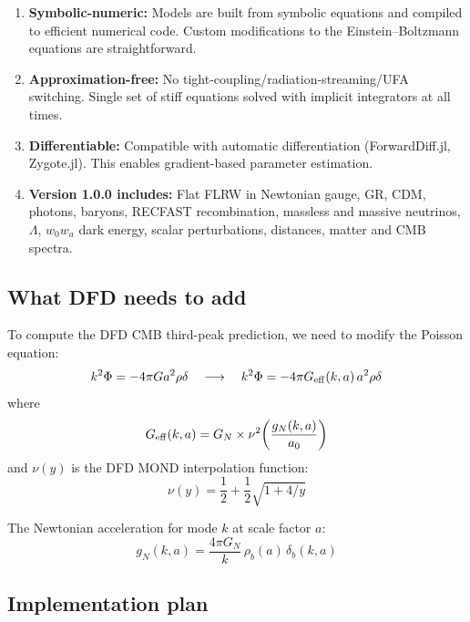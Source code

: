 \documentclass[11pt,a4paper]{article}
\begin{document}
\begin{enumerate}
\item \textbf{Symbolic-numeric:} Models are built from symbolic equations and compiled to efficient numerical code. Custom modifications to the Einstein--Boltzmann equations are straightforward.
\item \textbf{Approximation-free:} No tight-coupling/radiation-streaming/UFA switching. Single set of stiff equations solved with implicit integrators at all times.
\item \textbf{Differentiable:} Compatible with automatic differentiation (ForwardDiff.jl, Zygote.jl). This enables gradient-based parameter estimation.
\item \textbf{Version 1.0.0 includes:} Flat FLRW in Newtonian gauge, GR, CDM, photons, baryons, RECFAST recombination, massless and massive neutrinos, $\Lambda$, $w_0w_a$ dark energy, scalar perturbations, distances, matter and CMB spectra.
\end{enumerate}

\subsection{What DFD needs to add}

To compute the DFD CMB third-peak prediction, we need to modify the Poisson equation:
\begin{equation}
k^2\Phi = -4\pi G a^2 \rho\delta \quad \longrightarrow \quad k^2\Phi = -4\pi G_{\rm eff}(k, a)\,a^2\rho\delta
\end{equation}
where
\begin{equation}
G_{\rm eff}(k, a) = G_N \times \nu^2\!\left(\frac{g_N(k, a)}{a_0}\right)
\end{equation}
and $\nu(y)$ is the DFD MOND interpolation function:
\begin{equation}
\nu(y) = \frac{1}{2} + \frac{1}{2}\sqrt{1 + 4/y}
\end{equation}

The Newtonian acceleration for mode $k$ at scale factor $a$:
\begin{equation}
g_N(k, a) = \frac{4\pi G_N}{k}\,\rho_b(a)\,\delta_b(k, a)
\end{equation}

\subsection{Implementation plan}
\end{document}
